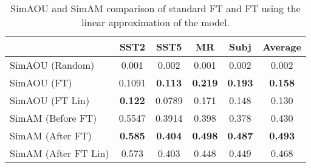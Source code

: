 \begin{table*}
	\centering
  \setlength{\tabcolsep}{7pt}
	\begin{tabular}{l | c c c c c }
    \toprule
    & SST2   & SST5   & MR     & Subj  & Average \\
		\midrule
    SimAOU (Random)   & 0.001  & 0.002  & 0.001  & 0.002 & 0.002          \\
		SimAOU (FT)       & 0.1091 & \textbf{0.113}  & \textbf{0.219}  & \textbf{0.193} & \textbf{0.158} \\
		SimAOU (FT Lin)   & \textbf{0.122}  & 0.0789 & 0.171  & 0.148 & 0.130          \\
    \midrule
    SimAM (Before FT)     & 0.5547 & 0.3914 & 0.398 & 0.378 & 0.430          \\
    SimAM (After FT)      & \textbf{0.585}  & \textbf{0.404}  & \textbf{0.498} & \textbf{0.487} & \textbf{0.493} \\
    SimAM (After FT Lin)  & 0.573  & 0.403  & 0.448 & 0.449 & 0.468          \\
  \end{tabular}

	\caption{
    SimAOU and SimAM comparison of standard FT and FT using the linear approximation of the model.	 		
  }
	\label{tabel:lin_results}
\end{table*}